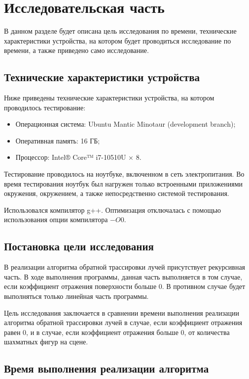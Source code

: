\chapter{Исследовательская часть}

В данном разделе будет описана цель исследования по времени, технические характеристики устройства, на котором будет проводиться исследование по времени, а также приведено само исследование.

\section{Технические характеристики устройства}

Ниже приведены технические характеристики устройства, на котором проводилось тестирование:

\begin{itemize}
	\item Операционная система: Ubuntu Mantic Minotaur (development branch);
	\item Оперативная память: 16 ГБ;
	\item Процессор: Intel® Core™ i7-10510U × 8.
\end{itemize}

Тестирование проводилось на ноутбуке, включенном в сеть электропитания. 
Во время тестирования ноутбук был нагружен только встроенными приложениями окружения, окружением, а также непосредственно системой тестирования. 

Использовался компилятор g++. 
Оптимизация отключалась с помощью использования опции компилятора $-O0$.

\section{Постановка цели исследования}

В реализации алгоритма обратной трассировки лучей присутствует рекурсивная часть. В ходе выполнения программы, данная часть выполняется в том случае, если коэффициент отражения поверхности больше 0. В противном случае будет выполняться только линейная часть программы. 

Цель исследования заключается в сравнении времени выполнения реализации алгоритма обратной трассировки лучей в случае, если коэффициент отражения равен 0, и в случае, если коэффициент отражения больше 0, от количества шахматных фигур на сцене.

\section{Время выполнения реализации алгоритма}

